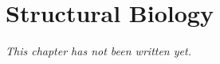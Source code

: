 \chapter{Structural Biology}\label{ch:b3:structural}


\emph{This chapter has not been written yet.}
